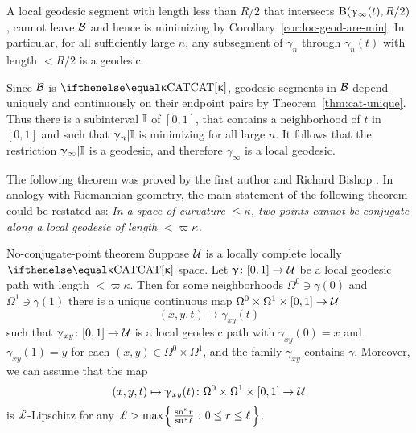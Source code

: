 
A local geodesic segment  with length less than $R/2$ that intersects $\mathrm{B}{}(\upgamma_\infty(t),R/2)$, cannot leave $\mathcal{B}$ and hence  is  minimizing by Corollary~\ref{cor:loc-geod-are-min}.  In particular, for all sufficiently large $n$, any subsegment  of $\gamma_n$ through $\gamma_n(t)$  with length $<R/2$ is a geodesic.


Since $\mathcal{B}$ is $\CAT\kappa$, geodesic segments in $\mathcal{B}$ depend uniquely and continuously on their endpoint pairs by Theorem~\ref{thm:cat-unique}.  
Thus there is a subinterval $\mathbb{I}$ of $[0,1]$,
that contains a neighborhood of $t$ in $[0,1]$
and such that $\upgamma_n|\mathbb{I}$ is minimizing for all large $n$.
It follows that the restriction $\upgamma_\infty|\mathbb{I}$ is a geodesic,
and therefore $\gamma_\infty$ is a local geodesic.
\qeds


The following theorem was proved by the first author and Richard Bishop \cite{a-b:h-c}.
In analogy with Riemannian geometry, the main statement of the following theorem could be restated as: 
\emph{In a space of curvature $\le\kappa$, two points cannot be conjugate along a local geodesic of length $<\varpi\kappa$.}


\begin{thm}{No-conjugate-point theorem}
\label{thm:no-conj-pt}
Suppose $\mathcal{U}$ is a locally complete locally $\CAT\kappa$ space.
Let $\gamma\:[0,1]\to\spc{U}$ be a local geodesic path with length $<\varpi\kappa$.
Then for some neighborhoods $\Omega^0\ni \gamma(0)$ and $\Omega^1\ni\gamma(1)$ 
there is a unique continuous map $\Omega^0\times \Omega^1\times[0,1]\to\spc{U}$
\[(x,y,t)\mapsto\gamma_{x y}(t)\]
such that 
$\gamma_{x y}\:[0,1]\to\spc{U}$ is a local geodesic path with 
$\gamma_{x y}(0)=x$ and 
$\gamma_{x y}(1)=y$ for each $(x,y)\in\Omega^0\times\Omega^1$,
and the family $\gamma_{x y}$ contains $\gamma$.  
Moreover, we can assume that the map 
\[(x,y,t)\mapsto\gamma_{x y}(t)\:\Omega^0\times\Omega^1\times[0,1]\to\spc{U}\] 
is $\Lip$-Lipschitz
for any
$\Lip>\max\set{\tfrac{\sn\kappa r}{\sn\kappa \ell}}{0\le r\le \ell}$.
\end{thm}

